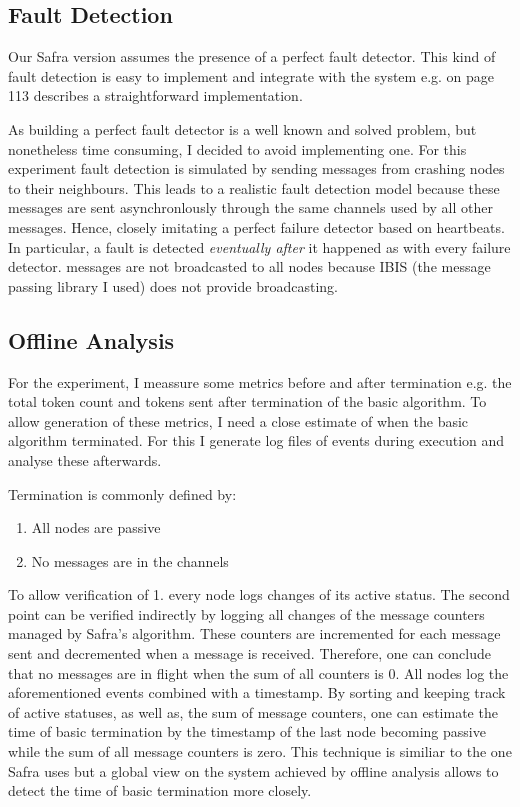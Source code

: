 \subsection{Fault Detection}
Our Safra version assumes the presence of a perfect fault detector.
This kind of fault detection is easy to implement and integrate with the system e.g.
\cite{Fokkink:2018} on page 113 describes a straightforward implementation.

As building a perfect fault detector is a well known and solved problem, but nonetheless time consuming, I decided to avoid implementing one.
For this experiment fault detection is simulated by sending  messages from crashing nodes to their neighbours. 
This leads to a realistic fault detection model because these messages are sent asynchronlously through the same channels used by all other messages. 
Hence, closely imitating a perfect failure detector based on heartbeats. 
In particular, a fault is detected \textit{eventually after} it happened as with every failure detector.
 messages are not broadcasted to all nodes because IBIS (the message passing library I used) does not provide broadcasting.  

\subsection{Offline Analysis}
\label{ssec:offline-analysis}
For the experiment, I meassure some metrics before and after termination e.g. the total token count and tokens sent after termination of the basic algorithm.
To allow generation of these metrics, I need a close estimate of when the basic algorithm terminated.
For this I generate log files of events during execution and analyse these afterwards.

Termination is commonly defined by:
\begin{enumerate}
	\item All nodes are passive
	\item No messages are in the channels
\end{enumerate}
To allow verification of 1. every node logs changes of its active status.
The second point can be verified indirectly by logging all changes of the message counters managed by Safra's algorithm.
These counters are incremented for each message sent and decremented when a message is received.
Therefore, one can conclude that no messages are in flight when the sum of all counters is 0.
All nodes log the aforementioned events combined with a timestamp.
By sorting and keeping track of active statuses, as well as, the sum of message counters, one can estimate the time of basic termination by the timestamp of the last node becoming passive while the sum of all message counters is zero.
This technique is similiar to the one Safra uses but a global view on the system achieved by offline analysis allows to detect the time of basic termination more closely.

